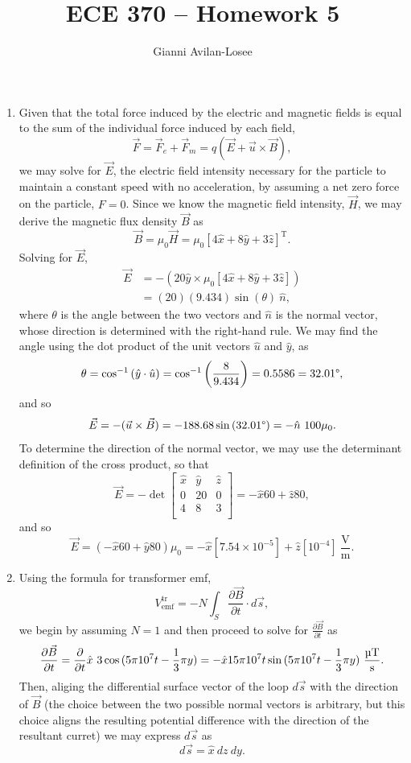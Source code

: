 \documentclass{article}
\title{ECE 370 -- Homework 5}
\author{Gianni Avilan-Losee}
\begin{document}

\begin{enumerate}
	\item Given that the total force induced by the electric and magnetic fields is equal to the sum of the individual force induced by each field, 
		\[
			\vec{F} = \vec{F}_e + \vec{F}_m = q(\vec{E} + \vec{u} \times \vec{B}),
		\]
		we may solve for \(\vec{E}\), the electric field intensity necessary for the particle to maintain a constant speed with no acceleration, by assuming a net zero force on the particle, \(F =0\). Since we know the magnetic field intensity, \(\vec{H}\), we may derive the magnetic flux density \(\vec{B}\) as 
		\[
			\vec{B} = \mu_0 \vec{H} = \mu_0[4 \hat{x} + 8 \hat{y} + 3 \hat{z}]^{\mathrm{T}}.
		\]
		Solving for \(\vec{E}\),
		\begin{align*}
			\vec{E} &= -(20 \hat{y} \times \mu_0[4 \hat{x} + 8 \hat{y} + 3 \hat{z}]) \\
							&=(20)(9.434)\sin{(\theta)} \ \hat{n},
		\end{align*}
		where \(\theta\) is the angle between the two vectors and \(\hat{n}\) is the normal vector, whose direction is determined with the right-hand rule. We may find the angle using the dot product of the unit vectors \(\hat{u}\) and \(\hat{y}\), as 
		\[
			\theta = \cos^{-1}{(\hat{y} \cdot \hat{u})} = \cos^{-1}\left(\frac{8}{9.434}\right) = 0.5586 = 32.01\degree,
		\]
		and so 
		\[
			\vec{E} = -(\vec{u} \times \vec{B}) = -188.68 \sin{(32.01\degree)} = -\hat{n} \ 100\mu_0.
		\]
		To determine the direction of the normal vector, we may use the determinant definition of the cross product, so that
		\[
			\vec{E} = -\det\begin{bmatrix}
				\hat{x} & \hat{y} & \hat{z} \\
				0 & 20 & 0 \\
				4 & 8 & 3 \\
			\end{bmatrix} = -\hat{x}60 + \hat{z} 80,
		\]
		and so 
		\[
			\vec{E} = (-\hat{x}60 + \hat{y}80)\mu_0 = -\hat{x}[7.54 \times 10^{-5}] + \hat{z}[10^{-4}] \ \mathrm{\frac{V}{m}}.
		\]

	\item Using the formula for transformer emf, 
		\[
			V^{\mathrm{tr}}_{\mathrm{emf}} = -N\int_S \frac{\partial \vec{B}}{\partial t} \cdot d \vec{s},
		\]
		we begin by assuming \(N = 1\) and then proceed to solve for \(\frac{\partial \vec{B}}{\partial t}\) as
		\[
			\frac{\partial \vec{B}}{\partial t} = \frac{\partial }{\partial t} \hat{x} \ 3\cos{(5\pi 10^7t-\frac{1}{3}\pi y)} = -\hat{x}15\pi10^7t\sin{(5\pi 10^7 t - \frac{1}{3}\pi y)} \ \mathrm{\frac{\micro T}{s}}.
		\]
		Then, aliging the differential surface vector of the loop \(d \vec{s}\) with the direction of \(\vec{B}\) (the choice between the two possible normal vectors is arbitrary, but this choice aligns the resulting potential difference with the direction of the resultant curret) we may express \(d \vec{s}\) as
		\[
		  d \vec{s} = \hat{x} \ dz \ dy.
		\]


\end{enumerate}
\end{document}
